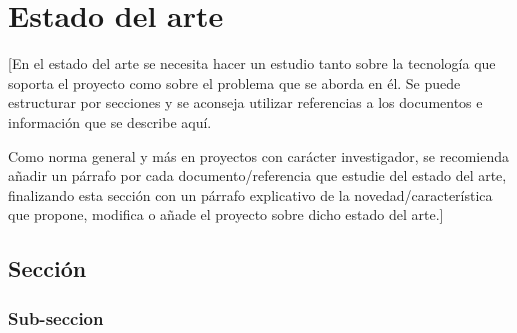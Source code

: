 \chapter{Estado del arte}\label{cap:estado_del_arte}
[En el estado del arte se necesita hacer un estudio tanto sobre la tecnología que soporta el proyecto como sobre el problema que se aborda en él. Se puede estructurar por secciones y se aconseja utilizar referencias a los documentos e información que se describe aquí.

    Como norma general y más en proyectos con carácter investigador, se recomienda añadir un párrafo por cada documento/referencia que estudie del estado del arte, finalizando esta sección con un párrafo explicativo de la novedad/característica que propone, modifica o añade el proyecto sobre dicho estado del arte.]

\section{Sección}\label{sec:seccion}


\subsection{Sub-seccion}\label{sec:subsection}

